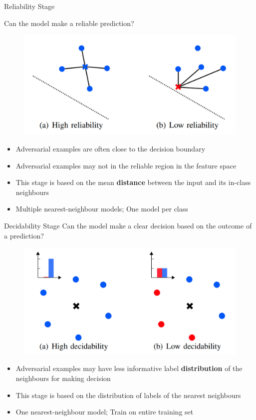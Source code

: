 \documentclass[9pt]{beamer}
\begin{document}
\begin{frame}{Reliability Stage}
\label{reliability}

Can the model make a reliable prediction?

\begin{figure}
    \centering
    \includegraphics[width=0.6\linewidth]{images/reliability.png}
\end{figure}

\begin{itemize}
    \item Adversarial examples are often close to the decision boundary
    \item Adversarial examples may not in the reliable region in the feature space
    \item This stage is based on the mean \textbf{distance} between the input and its in-class neighbours
    \item Multiple nearest-neighbour models; One model per class
\end{itemize}

\hyperlink{decision_boundary}{}
\end{frame}

\begin{frame}{Decidability Stage}
Can the model make a clear decision based on the outcome of a prediction?

\begin{figure}
    \centering
    \includegraphics[width=0.6\linewidth]{images/decidability.png}
\end{figure}

\begin{itemize}
    \item Adversarial examples may have less informative label \textbf{distribution} of the neighbours for making decision
    \item This stage is based on the distribution of labels of the nearest neighbours
    \item One nearest-neighbour model; Train on entire training set
\end{itemize}

\end{frame}
\end{document}
